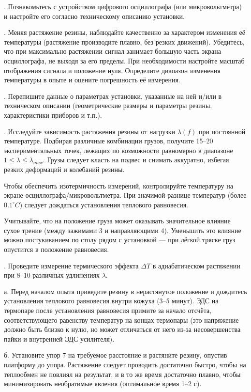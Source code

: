 \documentclass[a4paper,12pt]{article} %
\begin{document}
. Познакомьтесь с устройством цифрового осциллографа (или микровольтметра) и настройте его согласно техническому описанию установки.
\smallskip

. Меняя растяжение резины, наблюдайте качественно за характером изменения её температуры (растяжение производите плавно, без резких движений). Убедитесь, что при максимально растяжении сигнал занимает большую часть экрана осциллографа, не выходя за его пределы. При необходимости настройте масштаб отображения сигнала и положение нуля. Определите диапазон изменения температуры в опыте и оцените погрешность её измерения.
\smallskip

. Перепишите данные о параметрах установки, указанные на ней и/или в техническом описании (геометрические размеры и параметры резины, характеристики приборов и т.п.).
\smallskip

. Исследуйте зависимость растяжения резины от нагрузки $\lambda(f)$ при постоянной температуре. Подбирая различные комбинации грузов, получите 15–20 экспериментальных точек, лежащих по возможности равномерно в диапазоне $1 \leq \lambda \leq \lambda_{max}$. Грузы следует класть на подвес и снимать аккуратно,  избегая резких деформаций и колебаний резины.

    Чтобы обеспечить изотермичность измерений, контролируйте температуру на экране осциллографа/микровольтметра. При значимой разнице температур (более $0.1^{\circ}C$) следует дождаться установления теплового равновесия.

    Учитывайте, что на положение груза может оказывать значительное влияние сухое трение (между зажимами 3 и направляющими 4). Уменьшить это влияние можно постукиванием по столу рядом с установкой — при лёгкой тряске груз опустится в положение равновесия.

\smallskip
{}. Проведите измерение термического эффекта $\Delta T$ в адиабатическом растяжении при 8–10 различных удлинениях $\lambda$.

    а. Перед началом опыта приведите резину в нерастянутое положение и дождитесь установления теплового равновесия внутри кожуха (3–5 минут). ЭДС на термопаре после установления равновесия примите за начало отсчёта, соответствующего равенству температур на концах термопары (это напряжение должно быть близко к нулю, но может отличаться от него из-за несовершенства пайки и внутренней ЭДС усилителя).
    
    б. Установите упор 7 на требуемое расстояние и растяните резину, опустив платформу до упора. Растяжение следует проводить достаточно быстро, чтобы на теплообмен не повлиял на результат, и в то же время достаточно плавно, чтобы минимизировать необратимые явления (оптимальное время 1–2 с).
\end{document}

